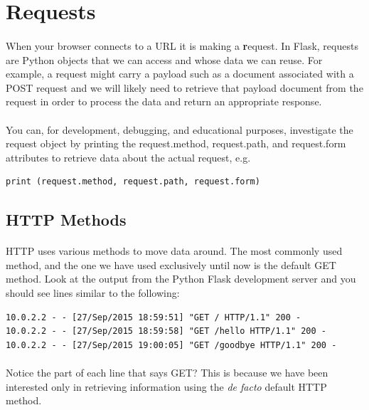 \documentclass[12pt, a4paper, oneside]{book}
\begin{document}
\section{Requests}
\label{requests}
\paragraph{} When your browser connects to a URL it is making a {\textbf request}. In Flask, requests are Python objects that we can access and whose data we can reuse. For example, a request might carry a payload such as a document associated with a POST request and we will likely need to retrieve that payload document from the request in order to process the data and return an appropriate response.

\paragraph{} You can, for development, debugging, and educational purposes, investigate the request object by printing the request.method, request.path, and request.form attributes to retrieve data about the actual request, e.g.

\begin{lstlisting}
print (request.method, request.path, request.form)
\end{lstlisting}

\subsection{HTTP Methods}
\label{http-methods}
\paragraph{} HTTP uses various methods to move data around. The most commonly used method, and the one we have used exclusively until now is the default GET method. Look at the output from the Python Flask development server and you should see lines similar to the following:

\begin{lstlisting}[style=DOS]
10.0.2.2 - - [27/Sep/2015 18:59:51] "GET / HTTP/1.1" 200 -
10.0.2.2 - - [27/Sep/2015 18:59:58] "GET /hello HTTP/1.1" 200 -
10.0.2.2 - - [27/Sep/2015 19:00:05] "GET /goodbye HTTP/1.1" 200 -
\end{lstlisting}

\paragraph{} Notice the part of each line that says GET? This is because we have been interested only in retrieving information using the \emph{de facto} default HTTP method.
\end{document}
